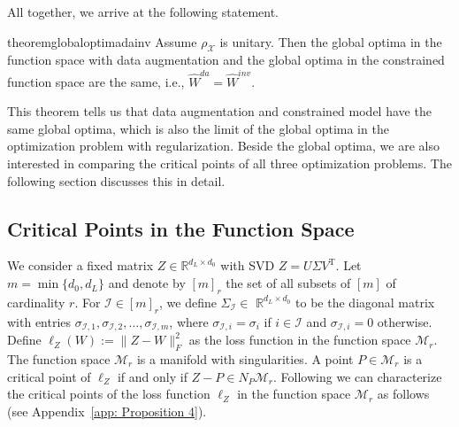 \documentclass{article}
\newcommand{\T}{\mathrm{T}}
\theoremstyle{plain}
\theoremstyle{definition}
\theoremstyle{remark}
\theoremstyle{remark}
\begin{document}
All together, we arrive at the following statement.
\begin{restatable}{theorem}{globaloptimadainv}
  \label{global_optima_da_inv}
  Assume $\rho_{\mathcal{X}}$ is unitary. Then the global optima in the function space with data augmentation and the global optima in the constrained function space are the same, i.e., $\widehat{W}^{da} = \widehat{W}^{inv}$.
\end{restatable}

This theorem tells us that data augmentation and constrained model have the same global optima, which is also the limit of the global optima in the optimization problem with regularization.
Beside the global optima, we are also interested in comparing the critical points of all three optimization problems. The following section discusses this in detail. 

\subsection{Critical Points in the Function Space}

We consider a fixed matrix $Z \in \mathbb{R}^{d_L \times d_0}$ with SVD $Z=U \Sigma V^{\T}$. 
Let $m = \min\{d_0, d_L\}$ and denote by $[m]_r$ the set of all subsets of $[m]$ of cardinality $r$. 
For $\mathcal{I} \in[m]_r$, we define $\Sigma_{\mathcal{I}} \in$ $\mathbb{R}^{d_L \times d_0}$ to be the diagonal matrix with entries $\sigma_{\mathcal{I}, 1}, \sigma_{\mathcal{I}, 2}, \ldots, \sigma_{\mathcal{I}, m}$, where $\sigma_{\mathcal{I}, i}=\sigma_i$ if $i \in \mathcal{I}$ and $\sigma_{\mathcal{I}, i}=0$ otherwise. 
Define $\ell_{Z}(W) := \|Z-W\|_F^2$ as the loss function in the function space $\mathcal{M}_r$. 
The function space $\mathcal{M}_r$ is a manifold with singularities. 
A point $P \in \mathcal{M}_r$ is a critical point of $\ell_{Z}$ if and only if $Z-P \in N_P\mathcal{M}_r$. 
Following \citet[][Theorem 28]{Trager2020Pure} we can characterize the critical points of the loss function $\ell_{Z}$ in the function space $\mathcal{M}_r$ as follows (see Appendix~\ref{app: Proposition 4}).
\end{document}
